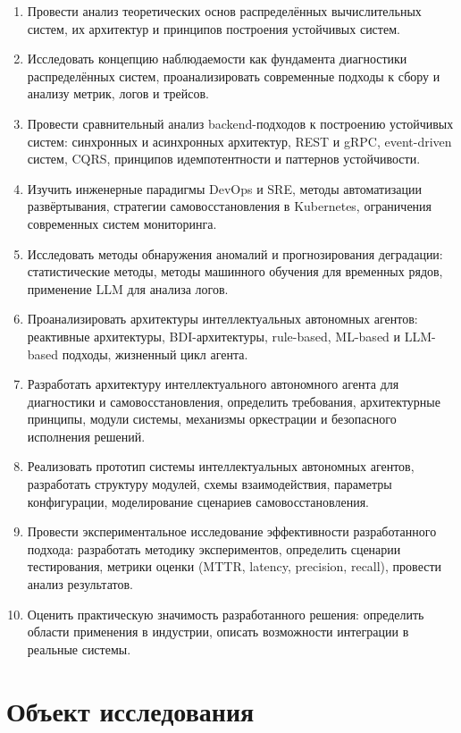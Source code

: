 \begin{enumerate}
    \item Провести анализ теоретических основ распределённых вычислительных систем, их архитектур и принципов построения устойчивых систем.
    \item Исследовать концепцию наблюдаемости как фундамента диагностики распределённых систем, проанализировать современные подходы к сбору и анализу метрик, логов и трейсов.
    \item Провести сравнительный анализ backend-подходов к построению устойчивых систем: синхронных и асинхронных архитектур, REST и gRPC, event-driven систем, CQRS, принципов идемпотентности и паттернов устойчивости.
    \item Изучить инженерные парадигмы DevOps и SRE, методы автоматизации развёртывания, стратегии самовосстановления в Kubernetes, ограничения современных систем мониторинга.
    \item Исследовать методы обнаружения аномалий и прогнозирования деградации: статистические методы, методы машинного обучения для временных рядов, применение LLM для анализа логов.
    \item Проанализировать архитектуры интеллектуальных автономных агентов: реактивные архитектуры, BDI-архитектуры, rule-based, ML-based и LLM-based подходы, жизненный цикл агента.
    \item Разработать архитектуру интеллектуального автономного агента для диагностики и самовосстановления, определить требования, архитектурные принципы, модули системы, механизмы оркестрации и безопасного исполнения решений.
    \item Реализовать прототип системы интеллектуальных автономных агентов, разработать структуру модулей, схемы взаимодействия, параметры конфигурации, моделирование сценариев самовосстановления.
    \item Провести экспериментальное исследование эффективности разработанного подхода: разработать методику экспериментов, определить сценарии тестирования, метрики оценки (MTTR, latency, precision, recall), провести анализ результатов.
    \item Оценить практическую значимость разработанного решения: определить области применения в индустрии, описать возможности интеграции в реальные системы.
\end{enumerate}

\section*{Объект исследования}

